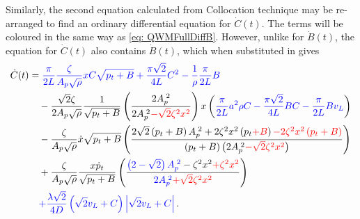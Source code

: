 Similarly, the second equation calculated from Collocation technique may be re-arranged to find an ordinary differential equation for $\dot{C}(t)$. The terms will be coloured in the same way as \cref{eq: QWMFullDiffB}. However, unlike for $\dot{B}(t)$, the equation for $\dot{C}(t)$ also contains $\dot{B}(t)$, which when substituted in gives
~
\begin{equation} \label{eq: QWMFullDiffC}
\begin{split}
    \dot{C}(t) &=
    \textcolor{Blue}{
    \frac{\pi}{2L} \frac{\zeta}{A_p \sqrt{\rho}} x C \sqrt{p_t + B}
    + \frac{\pi \sqrt{2}}{4 L} C^2
    - \frac{1}{\rho} \frac{\pi}{2L} B
    } \\ & \quad %
    - \frac{\sqrt{2} \zeta}{2 A_p \sqrt{\rho}} \frac{1}{\sqrt{p_t+B}} \left( \frac{2 A_p\power{2}}{2 A_p\power{2} \textcolor{Red}{- \sqrt{2} \zeta^2 x^2}} \right) x \left(
    \textcolor{Blue}{
    \frac{\pi}{2L} a^2 \rho C
    - \frac{\pi \sqrt{2}}{4 L} B C
    - \frac{\pi}{2L} B v_L }
    \right)
    \\ & \quad %
    - \frac{\zeta}{A_p \sqrt{\rho}} \dot{x} \sqrt{p_t + B} \left( 
    \frac{ 2 \sqrt{2} \left( p_t + B \right) A_p\power{2} + 2 \zeta^2 x^2 \left( p_t \textcolor{red}{+ B} \right) \textcolor{Red}{- 2 \zeta^2 x^2 \left( p_t + B \right)} }
    { \left( p_t + B \right) \left( 2 A_p\power{2} \textcolor{Red}{- \sqrt{2} \zeta^2 x^2} \right) }
    \right)
    \\ & \quad %
    + \frac{\zeta}{A_p \sqrt{\rho}} \frac{x \dot{p}_t}{\sqrt{p_t+B}} \left( \frac{
    \textcolor{Blue}{\left( 2 - \sqrt{2} \right) A_p\power{2}}
    - \zeta^2 x^2 \textcolor{Red}{+ \zeta^2 x^2}}{
    \textcolor{Blue}{2 A_p\power{2}}
    \textcolor{Red}{+ \sqrt{2} \zeta^2 x^2}} \right)
    \\ & \quad %
    \textcolor{Blue}{
    + \frac{\lambda \sqrt{2}}{4 D} \left( \sqrt{2} v_L + C \right) \left| \sqrt{2} v_L + C \right| } \, .
\end{split}
\end{equation}


